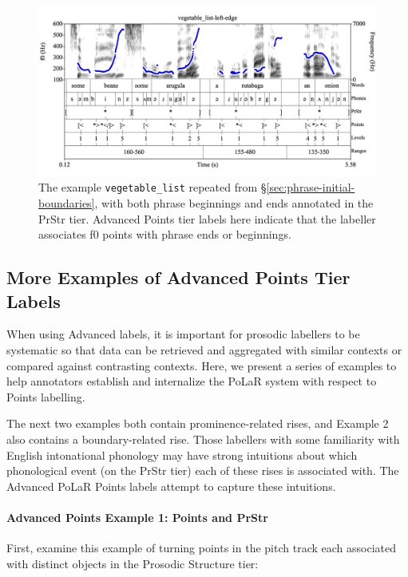 \documentclass[11pt, twoside]{memoir}
\begin{document}
\begin{figure}[H]
\centering
%
\includegraphics[width=.875\linewidth]{Points-vegetable_list-left-edge.png}
%
\caption[Advanced Points tier labels here indicate that the labeller associates f0 points with phrase ends or beginnings.]{The example \texttt{vegetable\_list} repeated from \S\ref{sec:phrase-initial-boundaries}, with both phrase beginnings and ends annotated in the PrStr tier. Advanced Points tier labels here indicate that the labeller associates f0 points with phrase ends or beginnings.%
\label{fig:vegetable list Points left edge Adv}%
}
\end{figure}


\subsection{More Examples of Advanced Points Tier Labels}\label{sec:more-examples-of-advanced-points-tier-labels}

When using Advanced labels, it is important for prosodic labellers to be systematic so that data can be retrieved and aggregated with similar contexts or compared against contrasting contexts. Here, we present a series of examples to help annotators establish and internalize the PoLaR system with respect to Points labelling.

The next two examples both contain prominence-related rises, and Example 2 also contains a boundary-related rise. Those labellers with some familiarity with English intonational phonology may have strong intuitions about which phonological event (on the PrStr tier) each of these rises is associated with. The Advanced PoLaR Points labels attempt to capture these intuitions.

\paragraph{Advanced Points Example 1: Points and PrStr}
First, examine this example of turning points in the pitch track each associated with distinct objects in the Prosodic Structure tier:
\end{document}

